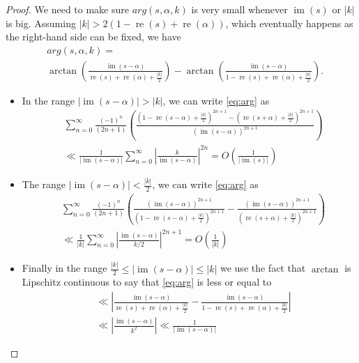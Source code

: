 \documentclass[10pt,a4paper]{amsart}
\newcommand{\imag}{\operatorname{im}}
\newcommand{\real}{\operatorname{re}}
\begin{document}
\begin{proof}
    We need to make sure $arg(s,\alpha,k)$ is very small whenever $\imag(s)$ or $\vert{k}\vert$ is big. Assuming $\vert{k}\vert > 2(1-\real(s)+\real(\alpha))$, which eventually happens as the right-hand side can be fixed, we have \begin{align}\label{eq:arg}&arg(s,\alpha,k) =\nonumber\\& \arctan\left(\frac{\imag(s-\alpha)}{\real(s)+\real(\alpha)+\frac{\vert{k}\vert}{2}}\right)-\arctan\left(\frac{\imag(s-\alpha)}{1-\real(s)+\real(\alpha)+\frac{\vert{k}\vert}{2}}\right).\end{align}
    \begin{itemize}
        \item In the range $\vert{\imag(s-\alpha)}\vert> \vert{k}\vert$,  we can write \eqref{eq:arg} as 
        \begin{align*}&\sum_{n=0}^{\infty}\frac{(-1)^n}{(2n+1)}\left(\frac{(1-\real(s-\alpha)+\frac{\vert{k}\vert}{2})^{2n+1}-(\real(s+\alpha)+\frac{\vert{k}\vert}{2})^{2n+1}}{(\imag(s-\alpha))^{2n+1}}\right) \\ 
        &\ll \frac{1}{\vert{\imag(s-\alpha)}\vert}\sum_{n=0}^{\infty}\left\vert{\frac{k}{\imag(s-\alpha)}}\right\vert^{2n} = O(\frac{1}{\vert{\imag(s)}\vert}) \end{align*}
        \item The range $\vert{\imag(s-\alpha)}\vert<\frac{\vert{k}\vert}{2}$, we can write \eqref{eq:arg} as 
        \begin{align*}
            &\sum_{n=0}^{\infty}\frac{(-1)^n}{(2n+1)}\left(\frac{(\imag(s-\alpha))^{2n+1}}{(1-\real(s-\alpha)+\frac{\vert{k}\vert}{2})^{2n+1}}-\frac{(\imag(s-\alpha))^{2n+1}}{(\real(s+\alpha)+\frac{\vert{k}\vert}{2})^{2n+1}}\right)\\
            &\ll \frac{1}{\vert{k}\vert}\sum_{n=0}^{\infty}\left\vert{\frac{\imag(s-\alpha)}{k/2}}\right\vert^{2n+1} = O(\frac{1}{\vert{k}\vert}) 
        \end{align*}
        \item Finally in the range $\frac{\vert{k}\vert}{2}\leq \vert{\imag(s-\alpha)}\vert\leq \vert{k}\vert$ we use the fact that $\arctan$ is Lipschitz continuous to say that \eqref{eq:arg} is less or equal to
        \begin{align*}
            &\ll\left\vert{\frac{\imag(s-\alpha)}{\real(s)+\real(\alpha)+\frac{\vert{k}\vert}{2}}-\frac{\imag(s-\alpha)}{1-\real(s)+\real(\alpha)+\frac{\vert{k}\vert}{2}}}\right\vert
            \\& \ll \left\vert{\frac{\imag(s-\alpha)}{k^2}}\right\vert \ll \frac{1}{\vert{\imag(s-\alpha)}\vert}

\end{align*}
\end{itemize}
\end{proof}
\end{document}
